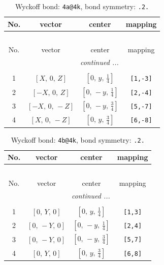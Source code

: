\documentclass[fleqn,8pt]{jsarticle}
\begin{document}
\begin{longtable}{cccc}
\caption{Wyckoff bond: {\tt 4a@4k}, bond symmetry: {\tt .2.}}
 \\
 \hline \hline
No. & vector & center & mapping \\ \hline \endfirsthead

\multicolumn{3}{l}{\tablename\ \thetable{}} \\
 \hline \hline
No. & vector & center & mapping \\ \hline \endhead

 \hline \hline
\multicolumn{3}{r}{\footnotesize\it continued ...} \\ \endfoot

 \hline \hline
\multicolumn{3}{r}{} \\ \endlastfoot

1 & $\left[ X,\, 0,\, Z \right]$ & $\left[ 0,\, y,\, \frac{1}{4} \right]$ & {\tt [1,-3]} \\ \hline
2 & $\left[ - X,\, 0,\, Z \right]$ & $\left[ 0,\, - y,\, \frac{1}{4} \right]$ & {\tt [2,-4]} \\ \hline
3 & $\left[ - X,\, 0,\, - Z \right]$ & $\left[ 0,\, - y,\, \frac{3}{4} \right]$ & {\tt [5,-7]} \\ \hline
4 & $\left[ X,\, 0,\, - Z \right]$ & $\left[ 0,\, y,\, \frac{3}{4} \right]$ & {\tt [6,-8]} \\
\end{longtable}
\renewcommand{\arraystretch}{1.2}
\begin{longtable}{cccc}
\caption{Wyckoff bond: {\tt 4b@4k}, bond symmetry: {\tt .2.}}
 \\
 \hline \hline
No. & vector & center & mapping \\ \hline \endfirsthead

\multicolumn{3}{l}{\tablename\ \thetable{}} \\
 \hline \hline
No. & vector & center & mapping \\ \hline \endhead

 \hline \hline
\multicolumn{3}{r}{\footnotesize\it continued ...} \\ \endfoot

 \hline \hline
\multicolumn{3}{r}{} \\ \endlastfoot

1 & $\left[ 0,\, Y,\, 0 \right]$ & $\left[ 0,\, y,\, \frac{1}{4} \right]$ & {\tt [1,3]} \\ \hline
2 & $\left[ 0,\, - Y,\, 0 \right]$ & $\left[ 0,\, - y,\, \frac{1}{4} \right]$ & {\tt [2,4]} \\ \hline
3 & $\left[ 0,\, - Y,\, 0 \right]$ & $\left[ 0,\, - y,\, \frac{3}{4} \right]$ & {\tt [5,7]} \\ \hline
4 & $\left[ 0,\, Y,\, 0 \right]$ & $\left[ 0,\, y,\, \frac{3}{4} \right]$ & {\tt [6,8]} \\
\end{longtable}
\end{document}
